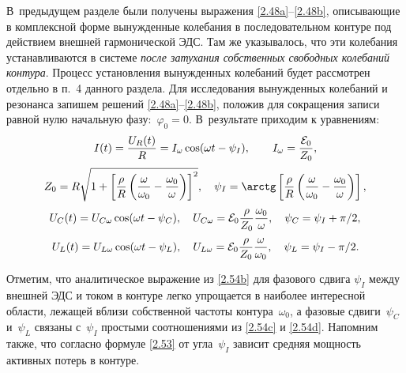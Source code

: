 \label{sec:resonance}

\label{sec:ures}

В~предыдущем разделе были получены выражения \eqref{2.48a}--\eqref{2.48b}, описывающие в
комплексной форме вынужденные колебания в последовательном контуре под действием
внешней гармонической ЭДС. Там же указывалось, что эти колебания 
устанавливаются в системе 
\emph{после затухания собственных свободных колебаний контура}. Процесс
установления вынужденных колебаний будет рассмотрен отдельно в п.~4 данного
раздела. Для исследования вынужденных колебаний и резонанса запишем
 решений \eqref{2.48a}--\eqref{2.48b},  
положив для сокращения записи равной нулю начальную фазу:~$\varphi_0=0$. 
В~результате приходим к уравнениям:
		\begin{equation}
			\eqmark{2.54a}
			I(t)=\frac{U_R(t)}{R}=I_{\omega}\cos(\omega t-\psi_I), \qquad 
            I_{\omega}=\frac{\mathcal{E}_0}{Z_0},
		\end{equation}
		\begin{equation}
			\eqmark{2.54b}
Z_0=R\sqrt{1+\left [\frac{\rho}{R}\left (\frac{\omega}{\omega_0}-\frac{\omega_0}{\omega}\right )\right ]^2},\quad
\psi_I=\arctg\left [\frac{\rho}{R}\left (\frac{\omega}{\omega_0}-\frac{\omega_0}{\omega}\right )\right],
		\end{equation}
		\begin{equation}
			\eqmark{2.54c}
U_C(t)=U_{C\omega}\cos(\omega t-\psi_C), 
\quad 
U_{C\omega}=\mathcal{E}_0\dfrac{\rho}{Z_0}\dfrac{\omega_0}{\omega}, 
\quad 
\psi_C=\psi_I+\pi/2,
		\end{equation}
		\begin{equation}
			\eqmark{2.54d}
U_L(t)=U_{L\omega}\cos(\omega t-\psi_L), 
\quad 
U_{L\omega}=\mathcal{E}_0\dfrac{\rho}{Z_0}\dfrac{\omega}{\omega_0}, 
\quad 
\psi_L=\psi_I-\pi/2.
		\end{equation}

Отметим, что аналитическое выражение из \eqref{2.54b} для фазового сдвига
$\psi_I$ между внешней ЭДС и током в контуре легко упрощается в наиболее
интересной области, лежащей вблизи собственной частоты контура~$\omega_0$, а
фазовые сдвиги~$\psi_C$ и~$\psi_L$ связаны с~$\psi_I$ простыми соотношениями из
\eqref{2.54c} и \eqref{2.54d}. Напомним также, что согласно формуле \eqref{2.53}
от угла~$\psi_I$ зависит средняя мощность активных потерь в контуре.


